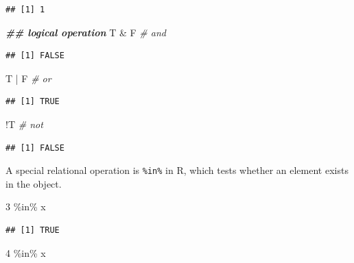 \documentclass[
  11pt,
]{book}
\newenvironment{Shaded}{\begin{snugshade}}{\end{snugshade}}
\newcommand{\CommentTok}[1]{\textcolor[rgb]{0.56,0.35,0.01}{\textit{#1}}}
\newcommand{\DecValTok}[1]{\textcolor[rgb]{0.00,0.00,0.81}{#1}}
\newcommand{\DocumentationTok}[1]{\textcolor[rgb]{0.56,0.35,0.01}{\textbf{\textit{#1}}}}
\newcommand{\NormalTok}[1]{#1}
\newcommand{\SpecialCharTok}[1]{\textcolor[rgb]{0.00,0.00,0.00}{#1}}
\begin{document}
\begin{verbatim}
## [1] 1
\end{verbatim}

\begin{Shaded}
\begin{Highlighting}[]
\DocumentationTok{\#\# logical operation}
\NormalTok{T }\SpecialCharTok{\&}\NormalTok{ F }\CommentTok{\# and}
\end{Highlighting}
\end{Shaded}

\begin{verbatim}
## [1] FALSE
\end{verbatim}

\begin{Shaded}
\begin{Highlighting}[]
\NormalTok{T }\SpecialCharTok{|}\NormalTok{ F }\CommentTok{\# or}
\end{Highlighting}
\end{Shaded}

\begin{verbatim}
## [1] TRUE
\end{verbatim}

\begin{Shaded}
\begin{Highlighting}[]
\SpecialCharTok{!}\NormalTok{T }\CommentTok{\# not}
\end{Highlighting}
\end{Shaded}

\begin{verbatim}
## [1] FALSE
\end{verbatim}

A special relational operation is \texttt{\%in\%} in R, which tests whether an element exists in the object.

\begin{Shaded}
\begin{Highlighting}[]
\DecValTok{3} \SpecialCharTok{\%in\%}\NormalTok{ x}
\end{Highlighting}
\end{Shaded}

\begin{verbatim}
## [1] TRUE
\end{verbatim}

\begin{Shaded}
\begin{Highlighting}[]
\DecValTok{4} \SpecialCharTok{\%in\%}\NormalTok{ x}
\end{Highlighting}
\end{Shaded}
\end{document}
